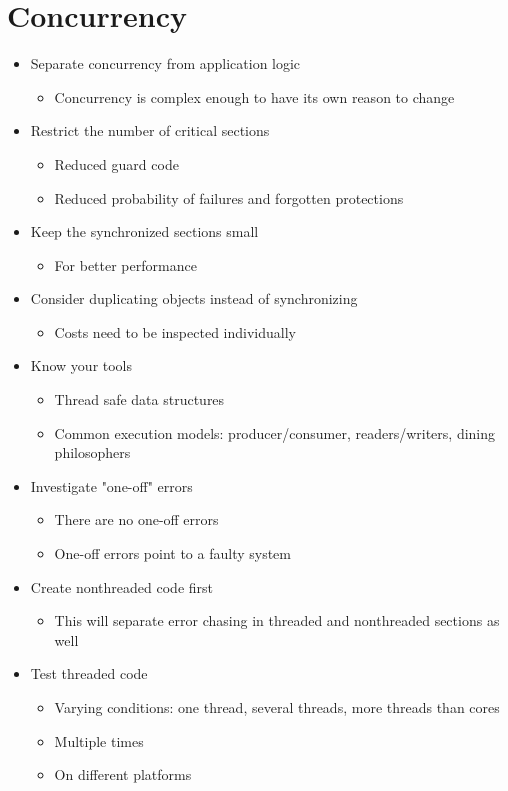 
\section*{Concurrency}
\begin{itemize}
    \item Separate concurrency from application logic
    \begin{itemize}
        \item Concurrency is complex enough to have its own reason to change
    \end{itemize}
    \item Restrict the number of critical sections
    \begin{itemize}
        \item Reduced guard code
        \item Reduced probability of failures and forgotten protections
    \end{itemize}
    \item Keep the synchronized sections small
    \begin{itemize}
        \item For better performance
    \end{itemize}
    \item Consider duplicating objects instead of synchronizing
    \begin{itemize}
        \item Costs need to be inspected individually
    \end{itemize}
    \item Know your tools
    \begin{itemize}
        \item Thread safe data structures
        \item Common execution models: producer/consumer, readers/writers, dining philosophers
    \end{itemize}
    \item Investigate "one-off" errors
    \begin{itemize}
        \item There are no one-off errors
        \item One-off errors point to a faulty system
    \end{itemize}
    \item Create nonthreaded code first
    \begin{itemize}
        \item This will separate error chasing in threaded and nonthreaded sections as well
    \end{itemize}
    \item Test threaded code
    \begin{itemize}
        \item Varying conditions: one thread, several threads, more threads than cores
        \item Multiple times
        \item On different platforms
    \end{itemize}
\end{itemize}